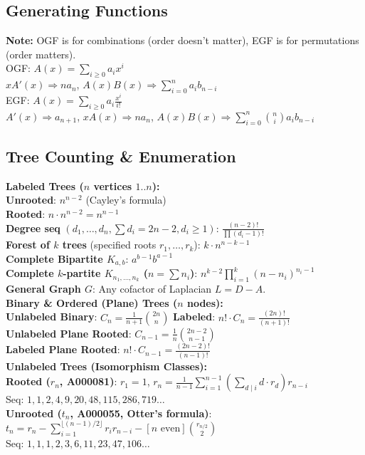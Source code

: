 \subsection{Generating Functions}
\textbf{Note:} OGF is for combinations (order doesn't matter), EGF is for permutations (order matters). \\
\textbullet{} OGF: $A(x) = \sum_{i \ge 0} a_i x^i$ \\
\textbullet{} $xA'(x) \Rightarrow n a_n$,
$A(x)B(x) \Rightarrow \sum_{i=0}^n a_i b_{n-i}$ \\
\textbullet{} EGF: $A(x) = \sum_{i \ge 0} a_i \frac{x^i}{i!}$ \\
\textbullet{} $A'(x) \Rightarrow a_{n+1}$,
$xA(x) \Rightarrow n a_n$,
$A(x)B(x) \Rightarrow \sum_{i=0}^n \binom{n}{i} a_i b_{n-i}$

\subsection{Tree Counting \texorpdfstring{\&}{&} Enumeration}
\textbf{Labeled Trees ($n$ vertices $1..n$):} \\
\textbullet{} \textbf{Unrooted}: $n^{n-2}$ \hfill (Cayley's formula) \\
\textbullet{} \textbf{Rooted}: $n \cdot n^{n-2} = n^{n-1}$ \\
\textbullet{} \textbf{Degree seq} $(d_1, \dots, d_n, \sum d_i = 2n-2, d_i \ge 1)$: $\frac{(n-2)!}{\prod (d_i - 1)!}$ \\
\textbullet{} \textbf{Forest of $k$ trees} (specified roots $r_1, \dots, r_k$): $k \cdot n^{n-k-1}$ \\
\textbullet{} \textbf{Complete Bipartite $K_{a,b}$}: $a^{b-1} b^{a-1}$ \\
\textbullet{} \textbf{Complete $k$-partite $K_{n_1,\dots,n_k}$ ($n = \sum n_i$)}:
$n^{k-2} \prod_{i=1}^k (n-n_i)^{n_i-1}$ \\
\textbullet{} \textbf{General Graph $G$}: Any cofactor of Laplacian $L = D - A$. \\
\textbf{Binary \& Ordered (Plane) Trees ($n$ nodes):} \\
\textbullet{} \textbf{Unlabeled Binary}: $C_n = \frac{1}{n+1}\binom{2n}{n}$ \hfill \textbf{Labeled}: $n! \cdot C_n = \frac{(2n)!}{(n+1)!}$ \\
\textbullet{} \textbf{Unlabeled Plane Rooted}: $C_{n-1} = \frac{1}{n}\binom{2n-2}{n-1}$ \\
\textbullet{} \textbf{Labeled Plane Rooted}: $n! \cdot C_{n-1} = \frac{(2n-2)!}{(n-1)!}$ \\
\textbf{Unlabeled Trees (Isomorphism Classes):} \\
\textbullet{} \textbf{Rooted ($r_n$, A000081)}: $r_1 = 1$,
$r_n = \frac{1}{n-1} \sum_{i=1}^{n-1} \left(\sum_{d \mid i} d \cdot r_d\right) r_{n-i}$ \\
Seq: $1, 1, 2, 4, 9, 20, 48, 115, 286, 719 \dots$ \\
\textbullet{} \textbf{Unrooted ($t_n$, A000055, Otter's formula)}: \\
$t_n = r_n - \sum_{i=1}^{\lfloor (n-1)/2 \rfloor} r_i r_{n-i} - [n \text{ even}] \binom{r_{n/2}}{2}$ \\
Seq: $1, 1, 1, 2, 3, 6, 11, 23, 47, 106 \dots$



